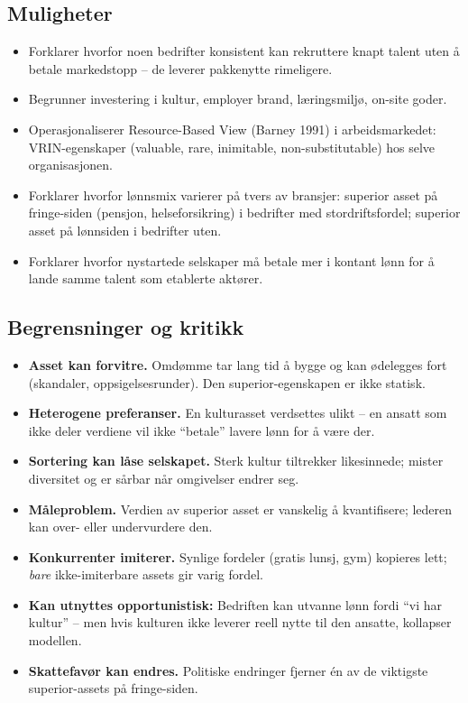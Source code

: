 \subsection*{Muligheter}
\begin{itemize}
\item Forklarer hvorfor noen bedrifter konsistent kan rekruttere knapt talent uten å betale markedstopp -- de leverer pakkenytte rimeligere.
\item Begrunner investering i kultur, employer brand, læringsmiljø, on-site goder.
\item Operasjonaliserer Resource-Based View (Barney 1991) i arbeidsmarkedet: VRIN-egenskaper (valuable, rare, inimitable, non-substitutable) hos selve organisasjonen.
\item Forklarer hvorfor lønnsmix varierer på tvers av bransjer: superior asset på fringe-siden (pensjon, helseforsikring) i bedrifter med stordriftsfordel; superior asset på lønnsiden i bedrifter uten.
\item Forklarer hvorfor nystartede selskaper må betale mer i kontant lønn for å lande samme talent som etablerte aktører.
\end{itemize}

\subsection*{Begrensninger og kritikk}
\begin{itemize}
\item \textbf{Asset kan forvitre.} Omdømme tar lang tid å bygge og kan ødelegges fort (skandaler, oppsigelsesrunder). Den superior-egenskapen er ikke statisk.
\item \textbf{Heterogene preferanser.} En kulturasset verdsettes ulikt -- en ansatt som ikke deler verdiene vil ikke ``betale'' lavere lønn for å være der.
\item \textbf{Sortering kan låse selskapet.} Sterk kultur tiltrekker likesinnede; mister diversitet og er sårbar når omgivelser endrer seg.
\item \textbf{Måleproblem.} Verdien av superior asset er vanskelig å kvantifisere; lederen kan over- eller undervurdere den.
\item \textbf{Konkurrenter imiterer.} Synlige fordeler (gratis lunsj, gym) kopieres lett; \emph{bare} ikke-imiterbare assets gir varig fordel.
\item \textbf{Kan utnyttes opportunistisk:} Bedriften kan utvanne lønn fordi ``vi har kultur'' -- men hvis kulturen ikke leverer reell nytte til den ansatte, kollapser modellen.
\item \textbf{Skattefavør kan endres.} Politiske endringer fjerner én av de viktigste superior-assets på fringe-siden.
\end{itemize}

